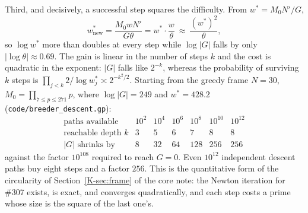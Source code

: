 \documentclass[11pt]{article}
\theoremstyle{definition}
\begin{document}
Third, and decisively, a successful step squares the difficulty. From $w^{*}=M_0N'/G$,
\[ w^{*}_{\mathrm{new}}=\frac{M_0wN'}{G\theta}=w^{*}\cdot\frac{w}{\theta}\ \approx\
   \frac{(w^{*})^{2}}{\theta}, \]
so $\log w^{*}$ more than doubles at every step while $\log|G|$ falls by only $|\log\theta|\approx
0.69$. The gain is linear in the number of steps $k$ and the cost is quadratic in the exponent:
$|G|$ falls like $2^{-k}$, whereas the probability of surviving $k$ steps is
$\prod_{j<k}2/\log w^{*}_j\asymp2^{-k^{2}/2}$. Starting from the greedy frame $N=30$,
$M_0=\prod_{7\le p\le271}p$, where $\log|G|=249$ and $w^{*}=428.2$
(\texttt{code/breeder\_descent.gp}):
\[
\begin{array}{l|cccccc}
\text{paths available} & 10^{2} & 10^{4} & 10^{6} & 10^{8} & 10^{10} & 10^{12}\\\hline
\text{reachable depth }k & 3 & 5 & 6 & 7 & 8 & 8\\
|G|\text{ shrinks by} & 8 & 32 & 64 & 128 & 256 & 256
\end{array}
\]
against the factor $10^{108}$ required to reach $G=0$. Even $10^{12}$ independent descent paths buy
eight steps and a factor $256$. This is the quantitative form of the circularity of
Section~\ref{K-sec:frame} of the core note: the Newton iteration for \#307 exists, is exact, and converges quadratically,
and each step costs a prime whose size is the square of the last one's.
\end{document}
